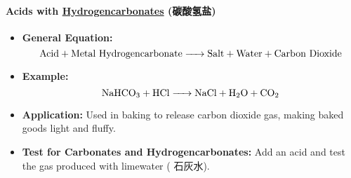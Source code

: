 \paragraph{Acids with \underline{Hydrogencarbonates} (碳酸氢盐)}
\begin{itemize}
    \item \textbf{General Equation:}
    \begin{equation}
        \ce{\text{Acid} + \text{Metal Hydrogencarbonate} -> \text{Salt} + \text{Water} + \text{Carbon Dioxide}}
    \end{equation}
    \item \textbf{Example:}
    \begin{equation}
        \ce{NaHCO3 + HCl -> NaCl + H2O + CO2}
    \end{equation}
    \item \textbf{Application:} Used in baking to release carbon dioxide gas, making baked goods light and fluffy.
    \item \textbf{Test for Carbonates and Hydrogencarbonates:} Add an acid and test the gas produced with limewater
    ( 石灰水).
\end{itemize}